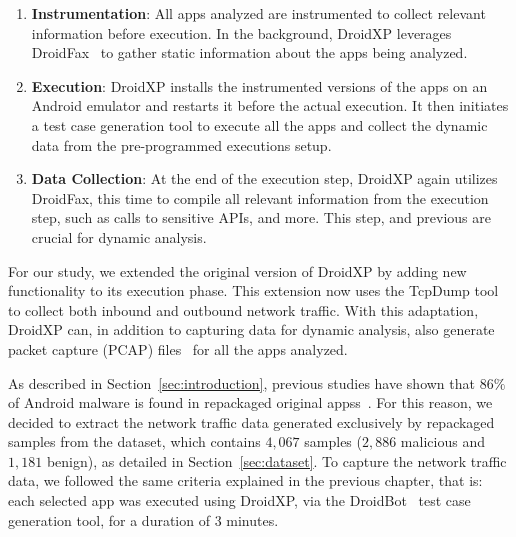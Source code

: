 
\begin{enumerate}[1.]
 \item \textbf{Instrumentation}:  All apps analyzed are instrumented to collect relevant information before execution. In the background, DroidXP leverages DroidFax~\cite{DBLP:conf/icsm/CaiR17a} to gather static information about the apps being analyzed.
 
   
 \item \textbf{Execution}: DroidXP installs the instrumented versions of the apps on an Android emulator and restarts it before the actual execution. It then initiates a test case generation tool to execute all the apps and collect the dynamic data from the pre-programmed executions setup.
  

\item \textbf{Data Collection}: At the end of the execution step, DroidXP again utilizes DroidFax, this time to compile all relevant information from the execution step, such as calls to sensitive APIs, and more. This step, and previous are crucial for dynamic analysis.
\end{enumerate}

For our study, we extended the original version of DroidXP by adding new functionality to its execution phase. This extension now uses the TcpDump tool to collect both inbound and outbound network traffic. With this adaptation, DroidXP can, in addition to capturing data for dynamic analysis, also generate packet capture (PCAP) files~\cite{DBLP:conf/iv/UhlarHR21} for all the apps analyzed.


As described in Section~\ref{sec:introduction}, previous studies have shown that $86\%$ of Android malware is found in repackaged original appss~\cite{DBLP:journals/tdsc/TianYRTP20,DBLP:conf/sp/ZhouJ12}. For this reason, we decided to extract the network traffic data generated exclusively by repackaged samples from the \cds dataset, which contains $4,067$ samples ($2,886$ malicious and $1,181$ benign), as detailed in Section~\ref{sec:dataset}. To capture the network traffic data, we followed the same criteria explained in the previous chapter, that is: each selected app was executed using DroidXP, via the DroidBot~\cite{DBLP:conf/icse/LiYGC17} test case generation tool, for a duration of $3$ minutes.

